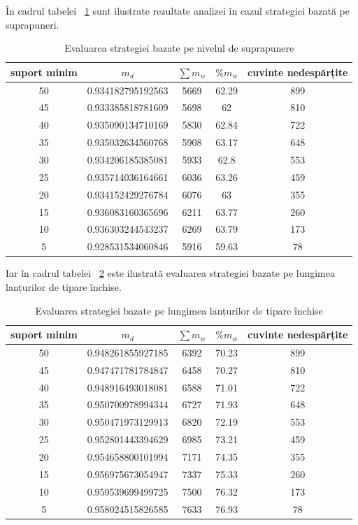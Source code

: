În cadrul tabelei ~\ref{table:overlapping} sunt ilustrate rezultate analizei în cazul strategiei bazată pe suprapuneri. 

\begin{table}[h!]
\centering
\begin{tabular}{|c|c|c|c|c|}
\hline
suport minim & $m_d$ & $\sum m_w$ & $\%{m_w}$ & cuvinte nedespărțite\\ 
\hline
\hline
50 & 0.934182795192563 & 5669 & 62.29 & 899\\ 
\hline
45 & 0.933385818781609 & 5698 & 62 & 810\\ 
\hline
40 & 0.935090134710169 & 5830 & 62.84 & 722\\ 
\hline
35 & 0.935032634560768 & 5908 & 63.17 & 648\\ 
\hline
30 & 0.934206185385081 & 5933 & 62.8 & 553\\ 
\hline
25 & 0.935714036164661 & 6036 & 63.26 & 459\\ 
\hline
20 & 0.934152429276784 & 6076 & 63 & 355\\ 
\hline
15 & 0.936083160365696 & 6211 & 63.77 & 260\\ 
\hline
10 & 0.936303244543237 & 6269 & 63.79 & 173\\ 
\hline
5 & 0.928531534060846 & 5916 & 59.63 & 78\\ 
\hline\end{tabular}
\caption{Evaluarea strategiei bazate pe nivelul de suprapunere} 
\label{table:overlapping}
\end{table}

Iar în cadrul tabelei ~\ref{table:shortest} este ilustrată evaluarea strategiei bazate pe lungimea lanțurilor de tipare închise.

\begin{table}[h!]
\centering
\begin{tabular}{|c|c|c|c|c|}
\hline
suport minim & $m_d$ & $\sum m_w$ & $\%{m_w}$ & cuvinte nedespărțite\\  
\hline
\hline
50 & 0.948261855927185 & 6392 & 70.23 & 899\\ 
\hline
45 & 0.947471781784847 & 6458 & 70.27 & 810\\ 
\hline
40 & 0.948916493018081 & 6588 & 71.01 & 722\\ 
\hline
35 & 0.950700978994344 & 6727 & 71.93 & 648\\ 
\hline
30 & 0.950471973129913 & 6820 & 72.19 & 553\\ 
\hline
25 & 0.952801443394629 & 6985 & 73.21 & 459\\ 
\hline
20 & 0.954658800101994 & 7171 & 74.35 & 355\\ 
\hline
15 & 0.956975673054947 & 7337 & 75.33 & 260\\ 
\hline
10 & 0.959539699499725 & 7500 & 76.32 & 173\\ 
\hline
5 & 0.958024515826585 & 7633 & 76.93 & 78\\ 
\hline\end{tabular}
\caption{Evaluarea strategiei bazate pe lungimea lanțurilor de tipare închise} 
\label{table:shortest}
\end{table}

